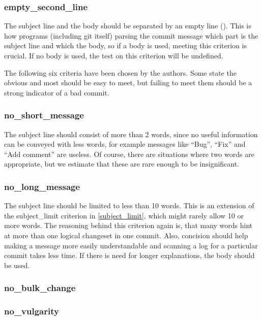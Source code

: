 \subsubsection{empty\_second\_line}
\label{subs:empty_second_line}
The subject line and the body should be separated by an empty line (\cite{TP}). This is how programs (including git itself) parsing the commit message which part is the subject line and which the body, so if a body is used, meeting this criterion is crucial. If no body is used, the test on this criterion will be undefined.

The following six criteria have been chosen by the authors. Some state the obvious and most should be easy to meet, but failing to meet them should be a strong indicator of a bad commit.

\subsubsection{no\_short\_message}
\label{subs:no_short_message}
The subject line should consist of more than 2 words, since no useful information can be conveyed with less words, for example messages like ``Bug'', ``Fix'' and ``Add comment'' are useless. Of course, there are situations where two words are appropriate, but we estimate that these are rare enough to be insignificant.

\subsubsection{no\_long\_message}
\label{subs:no_long_message}
The subject line should be limited to less than 10 words. This is an extension of the subject\_limit criterion in \ref{subject_limit}, which might rarely allow 10 or more words. The reasoning behind this criterion again is, that many words hint at more than one logical changeset in one commit. Also, concision should help making a message more easily understandable and scanning a log for a particular commit takes less time. If there is need for longer explanations, the body should be used.

\subsubsection{no\_bulk\_change}
\label{subs:no_bulk_change}

\subsubsection{no\_vulgarity}
\label{subs:no_vulgarity}

